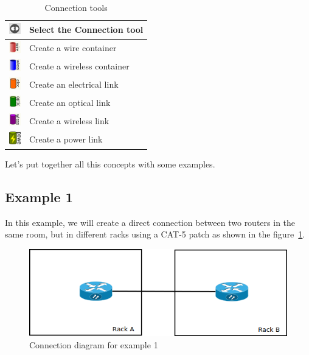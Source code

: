 \documentclass[a4paper]{article}
\begin{document}
		\begin{table}[h!]
			\centering
			\begin{tabular}{lp{10cm}}
				\includegraphics[width=0.5cm]{img/icon_connect_tool.png} & Select the Connection tool \\
				\midrule
				\includegraphics[width=0.5cm]{img/icon_wire_container.png} & Create a wire container \\
				\midrule
				\includegraphics[width=0.5cm]{img/icon_wireless_container.png} & Create a wireless container \\
				\midrule
				\includegraphics[width=0.5cm]{img/icon_electrical_link.png} & Create an electrical link \\
				\midrule
				\includegraphics[width=0.5cm]{img/icon_optical_link.png} & Create an optical link \\
				\midrule
				\includegraphics[width=0.5cm]{img/icon_wireless_link.png} & Create a wireless link \\
				\midrule
				\includegraphics[width=0.5cm]{img/icon_power_link.png} & Create a power link \\
			\end{tabular}
			\caption{Connection tools}
		\end{table}
		Let's put together all this concepts  with some examples. 
		\subsection{Example 1} \label{sec:physical_connections_example_1}
			In this example, we will create a direct connection between two routers in the same room, but in different racks using a CAT-5 patch as shown in the figure~\ref{fig:l1_example_1}.\newline
			\begin{figure}[h!]
				\centering
				\includegraphics[width=0.5\linewidth]{img/l1_example_1.png}
				\caption{Connection diagram for example 1}
				\label{fig:l1_example_1}
			\end{figure}
			
\end{document}
